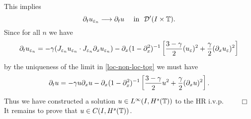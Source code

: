 %
This implies 
%
\begin{equation}
\label{distib-conv-2}
\partial_tu_{\varepsilon_n}  \longrightarrow  \partial_tu
\quad
\ \text{in} \   \,\, \mathcal{D}'(I\times \mathbb{T}).
\end{equation}
%
Since for all $n$ we have 
%
\begin{equation}
\partial_tu_{\varepsilon_n} 
=
-\gamma (J_{\varepsilon_n} u_{\varepsilon_n}  \cdot
J_{\varepsilon_n}\partial_x u_{\varepsilon_n}) - \partial_x (1-
\partial_x^2)^{-1} \left
[\frac{3-\gamma}{2}(u_\varepsilon)^2 + \frac{\gamma}{2}(\partial_x u_\varepsilon)^2 \right ] 
\end{equation}
%
by the uniqueness  of the limit in \eqref{loc-non-loc-tog}
we must have
%
\begin{equation}
\label{1000y}
\partial_t u =- \gamma u \partial_x u- \partial_x (1- \partial_x^2)^{-1} \left
[\frac{3-\gamma}{2}u^2 + \frac{\gamma}{2}(\partial_x u)^2 \right ].
\end{equation}
%
Thus we have constructed a solution $u \in L^\infty(I, H^s(\mathbb{T}))$
to the HR i.v.p. $\qquad \Box$
It remains to prove that $u \in C(I, H^s(\mathbb{T}))$.
%
%
%
%
%
